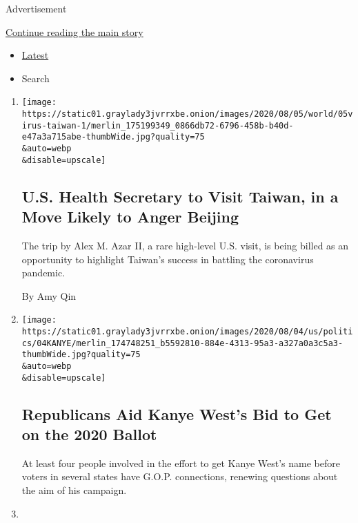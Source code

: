 Advertisement

\protect\hyperlink{after-mid1}{Continue reading the main story}

\begin{itemize}
\tightlist
\item
  \protect\hyperlink{stream-panel}{Latest}
\item
  Search
\end{itemize}

\begin{enumerate}
\def\labelenumi{\arabic{enumi}.}
\item
  \href{/2020/08/04/world/asia/taiwan-azar-beijing-coronavirus.html}{}

  \texttt{[image: https://static01.graylady3jvrrxbe.onion/images/2020/08/05/world/05virus-taiwan-1/merlin\_175199349\_0866db72-6796-458b-b40d-e47a3a715abe-thumbWide.jpg?quality=75\\\&auto=webp\\\&disable=upscale]}

  \hypertarget{us-health-secretary-to-visit-taiwan-in-a-move-likely-to-anger-beijing}{%
  \subsection{U.S. Health Secretary to Visit Taiwan, in a Move Likely to
  Anger
  Beijing}\label{us-health-secretary-to-visit-taiwan-in-a-move-likely-to-anger-beijing}}

  The trip by Alex M. Azar II, a rare high-level U.S. visit, is being
  billed as an opportunity to highlight Taiwan's success in battling the
  coronavirus pandemic.

  By Amy Qin
\item
  \href{/2020/08/04/us/politics/kanye-west-president-republicans.html}{}

  \texttt{[image: https://static01.graylady3jvrrxbe.onion/images/2020/08/04/us/politics/04KANYE/merlin\_174748251\_b5592810-884e-4313-95a3-a327a0a3c5a3-thumbWide.jpg?quality=75\\\&auto=webp\\\&disable=upscale]}

  \hypertarget{republicans-aid-kanye-wests-bid-to-get-on-the-2020-ballot}{%
  \subsection{Republicans Aid Kanye West's Bid to Get on the 2020
  Ballot}\label{republicans-aid-kanye-wests-bid-to-get-on-the-2020-ballot}}

  At least four people involved in the effort to get Kanye West's name
  before voters in several states have G.O.P. connections, renewing
  questions about the aim of his campaign.
\item
  \href{/2020/08/04/us/politics/coronavirus-recovery-plan-negotiations.html}{}


\end{enumerate}
